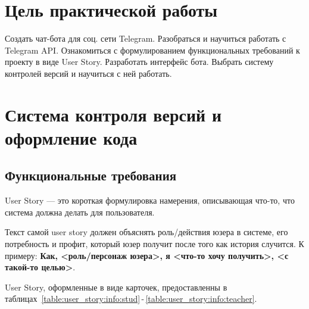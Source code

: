 \chapter*{Цель практической работы}
Создать чат-бота для соц. сети Telegram. Разобраться и научиться работать
с Telegram API. Ознакомиться с формулированием функциональных
требований к проекту в виде User Story. Разработать интерфейс бота.
Выбрать систему контролей версий и научиться с ней работать.

\chapter{Система контроля версий и оформление кода}
\section{Функциональные требования}
User Story --- это короткая формулировка намерения, описывающая что-то,
что система должна делать для пользователя.\par
Текст самой user story должен объяснять роль/действия юзера в системе,
его потребность и профит, который юзер получит после того как история
случится. К примеру: \textbf{Как, <роль/персонаж юзера>, я <что-то хочу
получить>, <с такой-то целью>}.

User Story, оформленные в виде карточек, предоставленны в
таблицах~\ref{table:user_story:info:stud}\,-\,\ref{table:user_story:info:teacher}.

